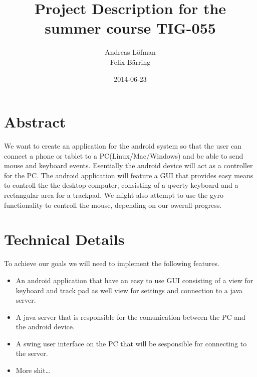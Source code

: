 \documentclass[11pt]{article}
\title{\textbf{Project Description for the summer course TIG-055}}
\author{Andreas Löfman\\
				Felix Bärring\\}
\date{2014-06-23}
\begin{document}
\maketitle

\section*{Abstract}

We want to create an application for the android system so that the user can connect a phone or tablet to a PC(Linux/Mac/Windows) and be able to send mouse and keyboard events. Esentially the android device will act as a controller for the PC. The android application will feature a GUI that provides easy means to controll the the desktop computer, consisting of a qwerty keyboard and a rectangular area for a trackpad. We might also attempt to use the gyro functionality to controll the mouse, depending on our owerall progress.


\section*{Technical Details} 

To achieve our goals we will need to implement the following features.

\begin{itemize}
\item {An android application that have an easy to use GUI consisting of a view for keyboard and track pad as well view for settings and connection to a java server.}
\item {A java server that is responsible for the comunication between the PC and the android device. 
}


\item {A swing user interface on the PC that will be sesponsible for connecting to the server.}

\item {More shit\ldots}

\end{itemize}
\end{document}

